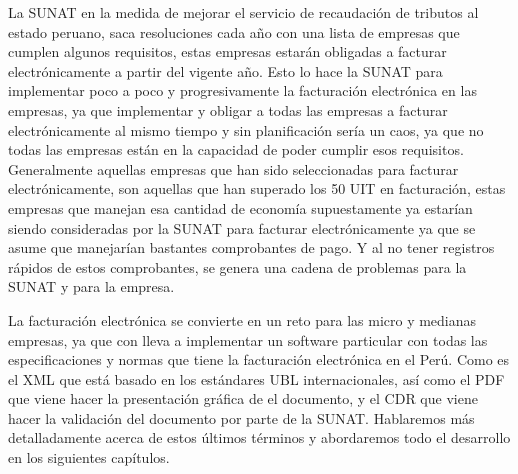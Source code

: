 La SUNAT en la medida de mejorar el servicio de recaudación de tributos al estado peruano, saca resoluciones cada año con una lista de empresas que cumplen algunos requisitos, estas empresas estarán obligadas a facturar electrónicamente a partir del vigente año. Esto lo hace la SUNAT para implementar poco a poco y progresivamente la facturación electrónica en las empresas, ya que implementar y obligar a todas las empresas a facturar electrónicamente al mismo tiempo y sin planificación sería un caos, ya que no todas las empresas están en la capacidad de poder cumplir esos requisitos.
Generalmente aquellas empresas que han sido seleccionadas para facturar electrónicamente, son aquellas que han superado los 50 UIT en facturación, estas empresas que manejan esa cantidad de economía supuestamente ya estarían siendo consideradas por la SUNAT para facturar electrónicamente ya que se asume que manejarían bastantes comprobantes de pago. Y al no tener registros rápidos de estos comprobantes, se genera una cadena de problemas para la SUNAT y para la empresa.

La facturación electrónica se convierte en un reto para las micro y medianas empresas, ya que con lleva a implementar un software particular con todas las especificaciones y normas que tiene la facturación electrónica en el Perú. Como es el XML que está basado en los estándares UBL internacionales, así como el PDF que viene hacer la presentación gráfica de el documento, y el CDR que viene hacer la validación del documento por parte de la SUNAT. Hablaremos más detalladamente acerca de estos últimos términos y abordaremos todo el desarrollo en los siguientes capítulos.